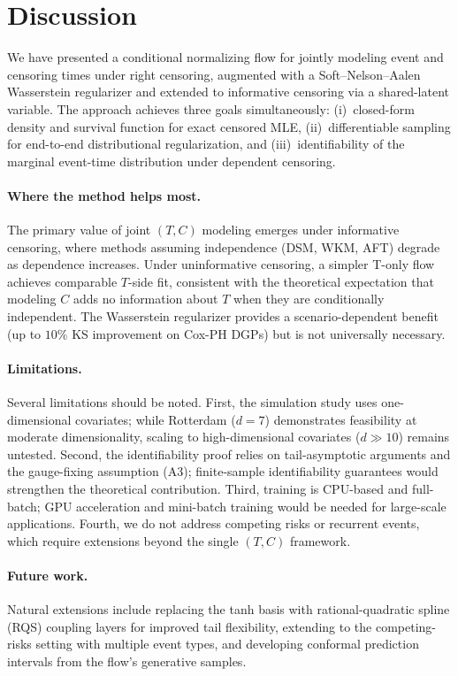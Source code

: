 \section{Discussion}
\label{sec:discussion}

We have presented a conditional normalizing flow for jointly modeling
event and censoring times under right censoring, augmented with a
Soft--Nelson--Aalen Wasserstein regularizer and extended to informative
censoring via a shared-latent variable. The approach achieves three
goals simultaneously: (i)~closed-form density and survival function for
exact censored MLE, (ii)~differentiable sampling for end-to-end
distributional regularization, and (iii)~identifiability of the marginal
event-time distribution under dependent censoring.

\paragraph{Where the method helps most.}
The primary value of joint $(T, C)$ modeling emerges under informative
censoring, where methods assuming independence (DSM, WKM, AFT) degrade
as dependence increases. Under uninformative censoring, a simpler T-only
flow achieves comparable $T$-side fit, consistent with the theoretical
expectation that modeling $C$ adds no information about $T$ when they
are conditionally independent. The Wasserstein regularizer provides a
scenario-dependent benefit (up to $10\%$ KS improvement on Cox-PH DGPs)
but is not universally necessary.

\paragraph{Limitations.}
Several limitations should be noted. First, the simulation study uses
one-dimensional covariates; while Rotterdam ($d = 7$) demonstrates
feasibility at moderate dimensionality, scaling to high-dimensional
covariates ($d \gg 10$) remains untested. Second, the identifiability
proof relies on tail-asymptotic arguments and the gauge-fixing
assumption (A3); finite-sample identifiability guarantees would
strengthen the theoretical contribution. Third, training is CPU-based
and full-batch; GPU acceleration and mini-batch training would be
needed for large-scale applications. Fourth, we do not address competing
risks or recurrent events, which require extensions beyond the single
$(T, C)$ framework.

\paragraph{Future work.}
Natural extensions include replacing the tanh basis with rational-quadratic
spline (RQS) coupling layers for improved tail flexibility, extending to
the competing-risks setting with multiple event types, and developing
conformal prediction intervals from the flow's generative samples.
